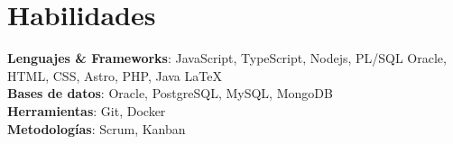 \documentclass[letterpaper,11pt]{article}
\makeatletter
\newcommand{\resumeItem}[1]{
  \item\small{
    #1 
  }
}
\newcommand{\resumeSubheading}[2]{
  \vspace{-1pt}\item
    \begin{tabular*}{1.0\textwidth}[t]{l@{\extracolsep{\fill}}r}
      \textbf{#1} & \textbf{\small #2} \\
    \end{tabular*}
}
\newcommand{\resumeSubHeadingListStart}{\begin{itemize}[leftmargin=0.0in, label={}]}
\newcommand{\resumeSubHeadingListEnd}{\end{itemize}}
\newcommand{\resumeItemListStart}{\begin{itemize}[leftmargin=3em]}
\newcommand{\resumeItemListEnd}{\end{itemize}\vspace{1pt}}
\makeatother
\begin{document}
%
\section{Habilidades}
 \begin{itemize}[leftmargin=0in,  label={}] %
    \small{
      \item{
        \textbf{Lenguajes \& Frameworks}{: JavaScript, TypeScript, Nodejs, PL/SQL Oracle,  HTML, CSS, Astro, PHP, Java \LaTeX} \\
        \textbf{Bases de datos}{: Oracle, PostgreSQL, MySQL, MongoDB} \\
        \textbf{Herramientas}{: Git, Docker} \\
        \textbf{Metodologías}{: Scrum, Kanban} \\
      }
     }
 \end{itemize}
 \vspace{-16pt}

\begin{comment}
\section{Leadership / Extracurricular}
    \resumeSubHeadingListStart
        \resumeSubheading{Fraternity}{Spring 2020 -- Present}{President}{University Name}
            \resumeItemListStart
                \resumeItem{Achieved a 4 star fraternity ranking by the Office of Fraternity and Sorority Affairs (highest possible ranking).}
                \resumeItem{Managed executive board of 5 members and ran weekly meetings to oversee progress in essential parts of the chapter.}
                \resumeItem{Led chapter of 30+ members to work towards goals that improve and promote community service, academics, and unity.}
            \resumeItemListEnd
        
    \resumeSubHeadingListEnd
 \end{comment}
\end{document}
